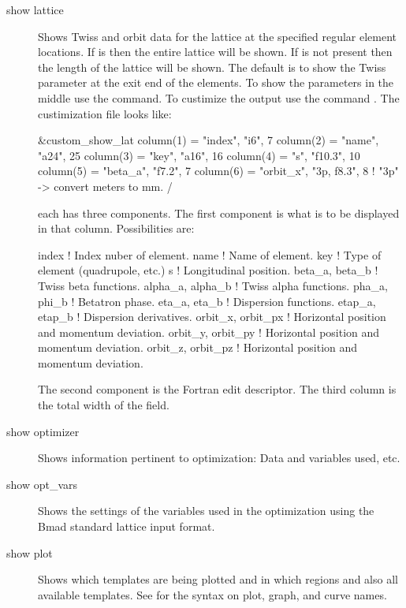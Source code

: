 {{\begin{description}
  \item[show lattice]
Shows Twiss and orbit data for the  lattice at the specified
regular element locations. If  is  then the
entire lattice will be shown. If  is not present then
the length of the lattice will be shown. The default is to show the Twiss
parameter at the exit end of the elements. To show the parameters in the 
middle use the  command. To custimize the output
use the command . The custimization
file looks like:
\begin{example}
  &custom_show_lat
    column(1) = "index",   "i6",     7 
    column(2) = "name",    "a24",   25
    column(3) = "key",     "a16",   16
    column(4) = "s",       "f10.3", 10
    column(5) = "beta_a",  "f7.2",   7
    column(6) = "orbit_x", "3p, f8.3", 8   ! "3p" -> convert meters to mm.
  /
\end{example}
each  has three components. The first component is what is to be 
displayed in that column. Possibilities are:
\begin{example}
  index              ! Index nuber of element.
  name               ! Name of element.
  key                ! Type of element (quadrupole, etc.)
  s                  ! Longitudinal position.
  beta_a,  beta_b    ! Twiss beta functions.
  alpha_a, alpha_b   ! Twiss alpha functions.
  pha_a,   phi_b     ! Betatron phase.
  eta_a,   eta_b     ! Dispersion functions.
  etap_a,  etap_b    ! Dispersion derivatives.
  orbit_x, orbit_px  ! Horizontal position and momentum deviation.
  orbit_y, orbit_py  ! Horizontal position and momentum deviation.
  orbit_z, orbit_pz  ! Horizontal position and momentum deviation.
\end{example}
The second component is the Fortran edit descriptor. The third column is the total
width of the field.


  \item[show optimizer]
Shows information pertinent to optimization: Data and variables used, etc.

  \item[show opt\_vars]
Shows the settings of the variables used in the optimization using the 
Bmad standard lattice input format.

  \item[show plot]
Shows which templates are being plotted and in which regions and also all
available templates. See  for the syntax on plot, graph, and
curve names.


\end{description}}}
